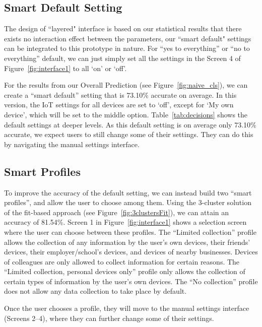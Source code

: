 \subsection{Smart Default Setting}
The design of ``layered" interface is based on our statistical results that there exists no interaction effect between the parameters, our ``smart default" settings can be integrated to this prototype in nature. For ``yes to everything'' or ``no to everything'' default, we can just simply set all the settings in the Screen 4 of Figure~\ref{fig:interface1} to all `on' or `off'.

For the results from our Overall Prediction (see Figure~\ref{fig:naive_cls}), we can create a ``smart default'' setting that is 73.10\% accurate on average. In this version, the IoT settings for all devices are set to `off', except for `My own device', which will be set to the middle option. Table~\ref{tab:decisions} shows the default settings at deeper levels.
As this default setting is on average only 73.10\% accurate, we expect users to still change some of their settings. They can do this by navigating the manual settings interface.

\subsection{Smart Profiles}
To improve the accuracy of the default setting, we can instead build two ``smart profiles'', and allow the user to choose among them. Using the 3-cluster solution of the fit-based approach (see Figure~\ref{fig:3clustersFit}), we can attain an accuracy of 81.54\%. Screen 1 in Figure~\ref{fig:interface1} shows a selection screen where the user can choose between these profiles. The ``Limited collection'' profile allows the collection of any information by the user's own devices, their friends' devices, their employer/school's devices, and devices of nearby businesses. Devices of colleagues are only allowed to collect information for certain reasons. The ``Limited collection, personal devices only'' profile only allows the collection of certain types of information by the user's own devices. The ``No collection'' profile does not allow any data collection to take place by default.

Once the user chooses a profile, they will move to the manual settings interface (Screens 2--4), where they can further change some of their settings.

